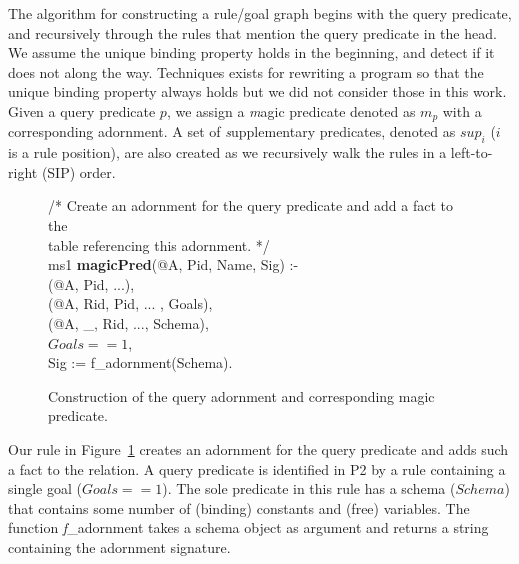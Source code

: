 The algorithm for constructing a rule/goal graph begins with the query
predicate, and recursively through the rules that mention the query predicate
in the head.  We assume the unique binding property holds in the beginning, and
detect if it does not along the way.  Techniques exists for rewriting a program
so that the unique binding property always holds but we did not consider those
in this work.  Given a query predicate $p$, we assign a {\emph magic predicate}
denoted as $m_p$ with a corresponding adornment.  A set of {\emph supplementary
predicates}, denoted as $sup_i$ ($i$ is a rule position), are also created as
we recursively walk the rules in a left-to-right (SIP) order.


\begin{figure}[!t]
\ssp
\centering
\begin{boxedminipage}{\linewidth}

/* Create an adornment for the query predicate and add a fact to the \\
 table referencing this adornment. */ \\
ms1 {\bf magicPred}(@A, Pid, Name, Sig) :- \\
(@A, Pid, ...), \\
(@A, Rid, Pid, ... , Goals), \\
(@A, \_, Rid, ..., Schema), \\
\datalogspace $Goals == 1$, \\
\datalogspace Sig := f\_adornment(Schema).
	
\end{boxedminipage}
\caption{\label{ch:magic:fig:magic1}Construction of the query adornment and corresponding magic predicate.}
\end{figure}

Our rule in Figure~\ref{ch:magic:fig:magic1} creates an adornment for the query
predicate and adds such a fact to the  relation.  A query
predicate is identified in P2 by a rule containing a single goal ($Goals ==
1$).  The sole predicate in this rule has a schema ($Schema$) that contains
some number of (binding) constants and (free) variables.  The function {\emph
f\_adornment} takes a schema object as argument and returns a string containing
the adornment signature.

